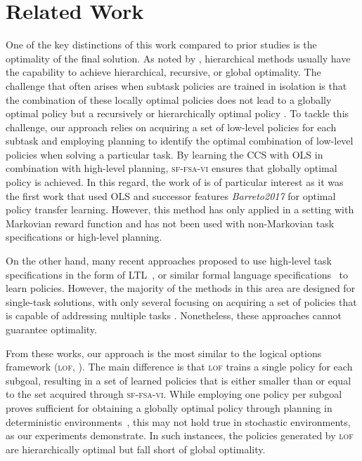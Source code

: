 \section{Related Work}
One of the key distinctions of this work compared to prior studies is the optimality of the final solution. As noted by \citep{Dietterich2000}, hierarchical methods usually have the capability to achieve hierarchical, recursive, or global optimality. The challenge that often arises when subtask policies are trained in isolation is that the combination of these locally optimal policies does not lead to a globally optimal policy but a recursively \citep{Dayan1992} or hierarchically optimal policy \citep{Sutton1999, Mann2015, Araki2021}.  To tackle this challenge, our approach relies on acquiring a set of low-level policies for each subtask and employing planning to identify the optimal combination of low-level policies when solving a particular task. By learning the CCS with OLS \citep{Roijers2014} in combination with high-level planning, \textsc{sf-fsa-vi} ensures that globally optimal policy is achieved. In this regard, the work of \citep{Alegre2022} is of particular interest as it was the first work that used OLS and successor features \textit{Barreto2017} for optimal policy transfer learning. However, this method has only applied in a setting with Markovian reward function and has not been used with non-Markovian task specifications or high-level planning. 

On the other hand, many recent approaches proposed to use high-level task specifications in the form of LTL~\citep{Icarte2018b, Kuo2020, Vaezipoor2021, Jothimurugan2021}, or similar formal language specifications~\citep{ToroIcarte2019,Camacho2019, Araki2021, Icarte2022} to learn policies. However, the majority of the methods in this area are designed for single-task solutions, with only several focusing on acquiring a set of policies that is capable of addressing multiple tasks \citep{Icarte2018b, Leon2020, Kuo2020, Araki2021, Vaezipoor2021}. Nonetheless, these approaches cannot guarantee optimality.

From these works, our approach is the most similar to the logical options framework (\textsc{lof}, \citet{Araki2021}). The main difference is that \textsc{lof} trains a single policy for each subgoal, resulting in a set of learned policies that is either smaller than or equal to the set acquired through \textsc{sf-fsa-vi}. While employing one policy per subgoal proves sufficient for obtaining a globally optimal policy through planning in deterministic environments~\citep{Wen2020}, this may not hold true in stochastic environments, as our experiments demonstrate. In such instances, the policies generated by \textsc{lof} are hierarchically optimal but fall short of global optimality.


